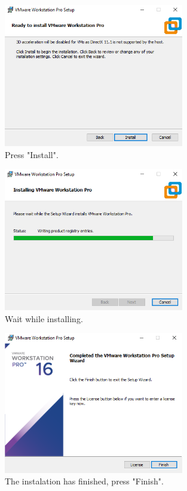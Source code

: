 \documentclass[a4paper]{article}
\begin{document}
    \clearpage
    \begin{figure}
        \centering
        \includegraphics[width=0.7\textwidth]{Images/Install_VMware/Install_VMware_6.png}
        \caption{Press "Install".}    
    \end{figure}

    \vfill

    \begin{figure}
        \centering
        \includegraphics[width=0.7\textwidth]{Images/Install_VMware/Install_VMware_7.png}
        \caption{Wait while installing.}    
    \end{figure}

    \clearpage
    \begin{figure}[h]
        \centering
        \includegraphics[width=0.7\textwidth]{Images/Install_VMware/Install_VMware_8.png}
        \caption{The instalation has finished, press "Finish".}                
    \end{figure}
\end{document}
